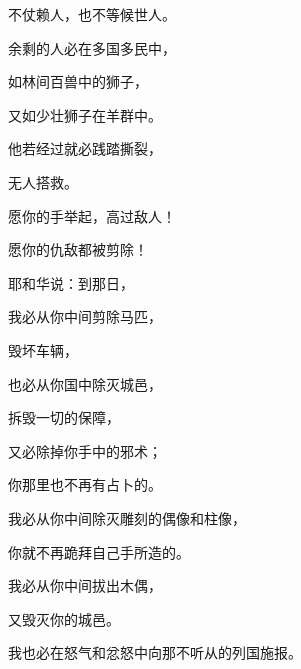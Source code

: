 {\par }{\Q 不仗赖人{}，也不等候世人{}。
\par }{\Q {}余剩的人必在多国多民中，
\par }{\Q 如林间百兽中的狮子，
\par }{\Q 又如少壮狮子在羊群中。
\par }{\Q 他若经过就必践踏撕裂，
\par }{\Q 无人搭救。
\par }{\Q {}愿你的手举起，高过敌人！
\par }{\Q 愿你的仇敌都被剪除！
\par }{\BB \par }{\Q {}耶和华说：到那日，
\par }{\Q 我必从你中间剪除马匹，
\par }{\Q 毁坏车辆，
\par }{\Q {}也必从你国中除灭城邑，
\par }{\Q 拆毁一切的保障，
\par }{\Q {}又必除掉你手中的邪术；
\par }{\Q 你那里也不再有占卜的。
\par }{\Q {}我必从你中间除灭雕刻的偶像和柱像，
\par }{\Q 你就不再跪拜自己手所造的。
\par }{\Q {}我必从你中间拔出木偶，
\par }{\Q 又毁灭你的城邑。
\par }{\Q {}我也必在怒气和忿怒中向那不听从的列国施报。

}

